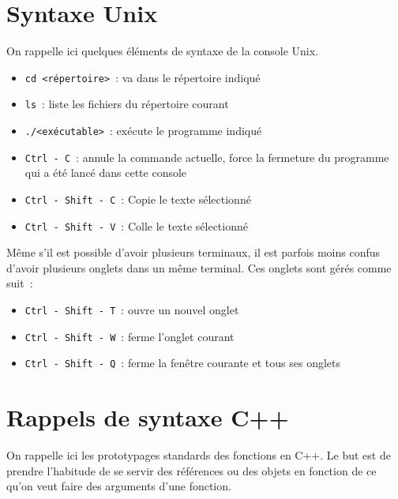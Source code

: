 \documentclass[12pt,a4paper]{article}
\begin{document}
\appendix

\newpage

\section{Syntaxe Unix}\label{anx:unix}

On rappelle ici quelques éléments de syntaxe de la console Unix.

\begin{itemize}
\item \texttt{cd <répertoire>}~: va dans le répertoire indiqué
\item \texttt{ls}~: liste les fichiers du répertoire courant
\item \texttt{./<exécutable>}~: exécute le programme indiqué 
\item \texttt{Ctrl - C}~: annule la commande actuelle, force la fermeture du programme qui a été lancé dans cette console
\item \texttt{Ctrl - Shift - C}~: Copie le texte sélectionné
\item \texttt{Ctrl - Shift - V}~: Colle le texte sélectionné
\end{itemize}

\medskip
Même s'il est possible d'avoir plusieurs terminaux, il est parfois moins confus d'avoir plusieurs onglets dans un même terminal.
Ces onglets sont gérés comme suit~:
\begin{itemize}
\item \texttt{Ctrl - Shift - T}~: ouvre un nouvel onglet
\item \texttt{Ctrl - Shift - W}~: ferme l'onglet courant
\item \texttt{Ctrl - Shift - Q}~: ferme la fenêtre courante et tous ses onglets
\end{itemize}

\section{Rappels de syntaxe C++}
\label{anx:cpp}

On rappelle ici les prototypages standards des fonctions en C++. Le but est de prendre l'habitude de se servir des références ou des objets en fonction de ce qu'on veut faire des arguments d'une fonction.
\end{document}
